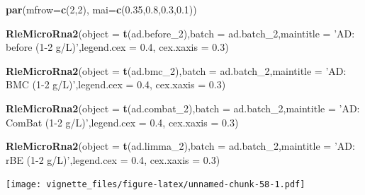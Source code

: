 \documentclass[]{book}
\newenvironment{Shaded}{\begin{snugshade}}{\end{snugshade}}
\newcommand{\KeywordTok}[1]{\textcolor[rgb]{0.13,0.29,0.53}{\textbf{#1}}}
\newcommand{\DataTypeTok}[1]{\textcolor[rgb]{0.13,0.29,0.53}{#1}}
\newcommand{\DecValTok}[1]{\textcolor[rgb]{0.00,0.00,0.81}{#1}}
\newcommand{\FloatTok}[1]{\textcolor[rgb]{0.00,0.00,0.81}{#1}}
\newcommand{\StringTok}[1]{\textcolor[rgb]{0.31,0.60,0.02}{#1}}
\newcommand{\NormalTok}[1]{#1}
\begin{document}
\begin{Shaded}
\begin{Highlighting}[]
\KeywordTok{par}\NormalTok{(}\DataTypeTok{mfrow=}\KeywordTok{c}\NormalTok{(}\DecValTok{2}\NormalTok{,}\DecValTok{2}\NormalTok{), }\DataTypeTok{mai=}\KeywordTok{c}\NormalTok{(}\FloatTok{0.35}\NormalTok{,}\FloatTok{0.8}\NormalTok{,}\FloatTok{0.3}\NormalTok{,}\FloatTok{0.1}\NormalTok{))}

\KeywordTok{RleMicroRna2}\NormalTok{(}\DataTypeTok{object =} \KeywordTok{t}\NormalTok{(ad.before_}\DecValTok{2}\NormalTok{),}\DataTypeTok{batch =}\NormalTok{ ad.batch_}\DecValTok{2}\NormalTok{,}\DataTypeTok{maintitle =} \StringTok{'AD: before (1-2 g/L)'}\NormalTok{,}\DataTypeTok{legend.cex =} \FloatTok{0.4}\NormalTok{, }\DataTypeTok{cex.xaxis =} \FloatTok{0.3}\NormalTok{)}

\KeywordTok{RleMicroRna2}\NormalTok{(}\DataTypeTok{object =} \KeywordTok{t}\NormalTok{(ad.bmc_}\DecValTok{2}\NormalTok{),}\DataTypeTok{batch =}\NormalTok{ ad.batch_}\DecValTok{2}\NormalTok{,}\DataTypeTok{maintitle =} \StringTok{'AD: BMC (1-2 g/L)'}\NormalTok{,}\DataTypeTok{legend.cex =} \FloatTok{0.4}\NormalTok{, }\DataTypeTok{cex.xaxis =} \FloatTok{0.3}\NormalTok{)}

\KeywordTok{RleMicroRna2}\NormalTok{(}\DataTypeTok{object =} \KeywordTok{t}\NormalTok{(ad.combat_}\DecValTok{2}\NormalTok{),}\DataTypeTok{batch =}\NormalTok{ ad.batch_}\DecValTok{2}\NormalTok{,}\DataTypeTok{maintitle =} \StringTok{'AD: ComBat (1-2 g/L)'}\NormalTok{,}\DataTypeTok{legend.cex =} \FloatTok{0.4}\NormalTok{, }\DataTypeTok{cex.xaxis =} \FloatTok{0.3}\NormalTok{)}

\KeywordTok{RleMicroRna2}\NormalTok{(}\DataTypeTok{object =} \KeywordTok{t}\NormalTok{(ad.limma_}\DecValTok{2}\NormalTok{),}\DataTypeTok{batch =}\NormalTok{ ad.batch_}\DecValTok{2}\NormalTok{,}\DataTypeTok{maintitle =} \StringTok{'AD: rBE (1-2 g/L)'}\NormalTok{,}\DataTypeTok{legend.cex =} \FloatTok{0.4}\NormalTok{, }\DataTypeTok{cex.xaxis =} \FloatTok{0.3}\NormalTok{)}
\end{Highlighting}
\end{Shaded}

\texttt{[image: vignette\_files/figure-latex/unnamed-chunk-58-1.pdf]}
\end{document}
